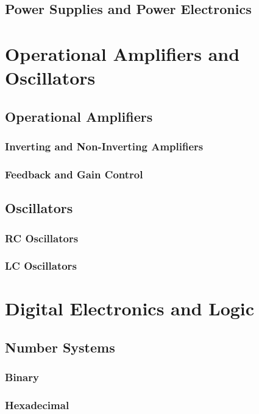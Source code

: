 \documentclass[11pt]{article}
\begin{document}
\subsection{Power Supplies and Power Electronics}
\label{subsec:power_electronics}

\section{Operational Amplifiers and Oscillators} \label{sec:opamps_oscillators}
\subsection{Operational Amplifiers} \label{subsec:opamps}
\subsubsection{Inverting and Non-Inverting Amplifiers}
\subsubsection{Feedback and Gain Control}
\subsection{Oscillators} \label{subsec:oscillators}
\subsubsection{RC Oscillators}
\subsubsection{LC Oscillators}

\section{Digital Electronics and Logic} \label{sec:digital_electronics}
\subsection{Number Systems} \label{subsec:number_systems}
\subsubsection{Binary}
\subsubsection{Hexadecimal}
\end{document}
